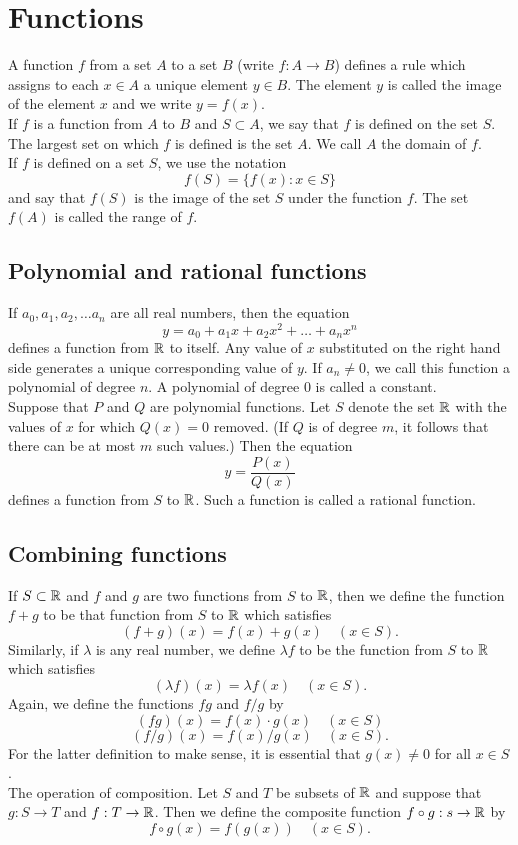 \documentclass[10pt, a4paper]{article}
\begin{document}
\newpage

\section{Functions}
A function $f$ from a set $A$ to a set $B$ (write $f : A \rightarrow B$) defines a rule which assigns to each $x \in A$ a unique element $y \in B$. The element $y$ is called the image of the element $x$ and we write $y = f(x)$.
\\
If $f$ is a function from $A$ to $B$ and $S \subset A$, we say that $f$ is defined on the set $S$. The largest set on which $f$ is defined is the set $A$. We call $A$ the domain of $f$.
\\
If $f$ is defined on a set $S$, we use the notation
$$f(S) = \{f(x) : x \in S\}$$
and say that $f(S)$ is the image of the set $S$ under the function $f$. The set $f(A)$ is called the range of $f$.

\subsection{Polynomial and rational functions}
If $a_0, a_1, a_2, \dotsc a_n$ are all real numbers, then the equation
$$y = a_0 + a_1x + a_2x ^ 2 + \dotsc + a_nx ^ n$$
defines a function from $\mathbb{R}$ to itself. Any value of $x$ substituted on the right hand side generates a unique corresponding value of $y$. If $a_n \neq 0$, we call this function a polynomial of degree $n$. A polynomial of degree $0$ is called a constant. \\
Suppose that $P$ and $Q$ are polynomial functions. Let $S$ denote the set $\mathbb{R}$ with the values of $x$ for which $Q(x) = 0$ removed. (If $Q$ is of degree $m$, it follows that there can be at most $m$ such values.) Then the equation
$$y = \frac{P(x)}{Q(x)}$$
defines a function from $S$ to $\mathbb{R}$. Such a function is called a rational function.

\subsection{Combining functions}
If $S \subset \mathbb{R}$ and $f$ and $g$ are two functions from $S$ to $\mathbb{R}$, then we define the function $f + g$ to be that function from $S$ to $\mathbb{R}$ which satisfies
$$(f + g)(x) = f(x) + g(x)\quad(x \in S).$$
Similarly, if $\lambda$ is any real number, we define $\lambda f$ to be the function from $S$ to $\mathbb{R}$ which satisfies
$$(\lambda f)(x) = \lambda f(x)\quad(x \in S).$$
Again, we define the functions $fg$ and $f/g$ by
$$(fg)(x) = f(x) \cdot g(x)\quad(x \in S)$$
$$(f/g)(x) = f(x)/g(x)\quad(x \in S).$$
For the latter definition to make sense, it is essential that $g(x) \neq 0$ for all $x \in S$.
\\
The operation of composition. Let $S$ and $T$ be subsets of $\mathbb{R}$ and suppose that $g: S \rightarrow T$ and $f : T \rightarrow \mathbb{R}$. Then we define the composite function $f \circ g: s \rightarrow \mathbb{R}$ by
$$f \circ g(x) = f(g(x))\quad(x \in S).$$
\end{document}
